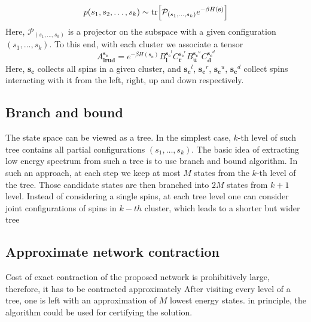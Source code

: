 \begin{equation}
    p(s_1, s_2, \ldots, s_k) \sim \tr[\mathcal{P}_{(s_1, \ldots, s_k)} e^{-\beta H(\mathbf{s})}]
\end{equation}
Here, $\mathcal{P}_{(s_1, \ldots, s_k)}$ is a projector on the subspace with a given configuration $(s_1, \ldots, s_k)$.
To this end, with each cluster we associate a tensor
\begin{equation}
A^{\mathbf{s_c}}_{\mathbf{lrud}} = e^{-\beta H(\mathbf{s_c})} B^{\mathbf{s_c}^l}_\mathbf{l}C^{\mathbf{s_c}^r}_\mathbf{r}B^{\mathbf{s_c}^u}_\mathbf{u}C^{\mathbf{s_c}^d}_\mathbf{d}
\end{equation}
Here, $\mathbf{s_c}$ collects all spins in a given cluster, and $\mathbf{s_c}^l$, $\mathbf{s_c}^r$, $\mathbf{s_c}^u$, $\mathbf{s_c}^d$ collect spins interacting with it from the left, right, up and down respectively.


\subsection{Branch and bound}
The state space can be viewed as a tree. In the simplest case, $k$-th level of such tree contains all partial configurations $(s_1, \ldots, s_k)$. The basic idea of extracting low energy spectrum from such a tree is to use branch and bound algorithm. In such an approach, at each step we keep at most $M$ states from the $k$-th level of the tree. Those candidate states are then branched into $2M$ states from $k+1$ level. Instead of considering a single spins, at each tree level one can consider joint configurations of spins in $k-th$ cluster,
which leads to a shorter but wider tree 
\subsection{Approximate network contraction}
Cost of exact contraction of the proposed network is prohibitively large, therefore, it has to be contracted approximately
After visiting every level of a tree, one is left with an approximation of $M$ lowest energy states. in principle, the algorithm could be used for certifying the solution.